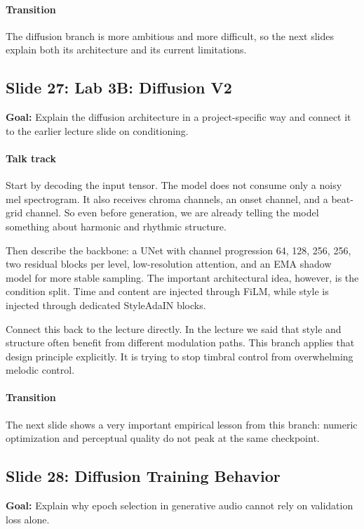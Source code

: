 \documentclass[11pt]{article}
\begin{document}
\paragraph{Transition}
The diffusion branch is more ambitious and more difficult, so the next slides explain both its architecture and its current limitations.

\subsection*{Slide 27: Lab 3B: Diffusion V2}
\textbf{Goal:} Explain the diffusion architecture in a project-specific way and connect it to the earlier lecture slide on conditioning.
\paragraph{Talk track}
Start by decoding the input tensor. The model does not consume only a noisy mel spectrogram. It also receives chroma channels, an onset channel, and a beat-grid channel. So even before generation, we are already telling the model something about harmonic and rhythmic structure.

Then describe the backbone: a UNet with channel progression 64, 128, 256, 256, two residual blocks per level, low-resolution attention, and an EMA shadow model for more stable sampling. The important architectural idea, however, is the condition split. Time and content are injected through FiLM, while style is injected through dedicated StyleAdaIN blocks.

Connect this back to the lecture directly. In the lecture we said that style and structure often benefit from different modulation paths. This branch applies that design principle explicitly. It is trying to stop timbral control from overwhelming melodic control.

\paragraph{Transition}
The next slide shows a very important empirical lesson from this branch: numeric optimization and perceptual quality do not peak at the same checkpoint.

\subsection*{Slide 28: Diffusion Training Behavior}
\textbf{Goal:} Explain why epoch selection in generative audio cannot rely on validation loss alone.
\end{document}
